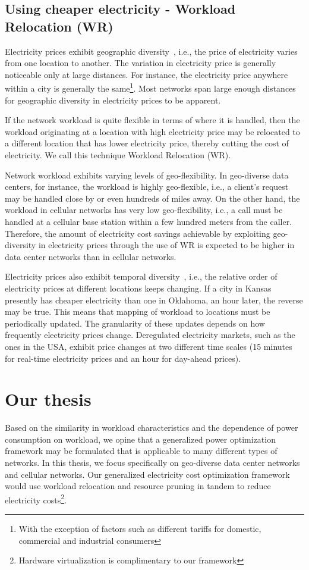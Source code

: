 \subsection{Using cheaper electricity - Workload Relocation (WR)}
Electricity prices exhibit geographic diversity~\cite{qureshiHotnets}, i.e., the price of electricity varies from one location to another. The variation in electricity price is generally noticeable only at large distances. For instance, the electricity price anywhere within a city is generally the same\footnote{With the exception of factors such as different tariffs for domestic, commercial and industrial consumers}. Most networks span large enough distances for geographic diversity in electricity prices to be apparent. 

If the network workload is quite flexible in terms of where it is handled, then the workload originating at a location with high electricity price may be relocated to a different location that has lower electricity price, thereby cutting the cost of electricity. We call this technique Workload Relocation (WR). 

Network workload exhibits varying levels of geo-flexibility. In geo-diverse data centers, for instance, the workload is highly geo-flexible, i.e., a client's request may be handled close by or even hundreds of miles away. On the other hand, the workload in cellular networks has very low geo-flexibility, i.e., a call must be handled at a cellular base station within a few hundred meters from the caller. Therefore, the amount of electricity cost savings achievable by exploiting geo-diversity in electricity prices through the use of WR is expected to be higher in data center networks than in cellular networks.

Electricity prices also exhibit temporal diversity~\cite{qureshiHotnets}, i.e., the relative order of electricity prices at different locations keeps changing. If a city in Kansas presently has cheaper electricity than one in Oklahoma, an hour later, the reverse may be true. This means that mapping of workload to locations must be periodically updated. The granularity of these updates depends on how frequently electricity prices change. Deregulated electricity markets, such as the ones in the USA, exhibit price changes at two different time scales (15 minutes for real-time electricity prices and an hour for day-ahead prices). 


\section{Our thesis} Based on the similarity in workload characteristics and the dependence of power consumption on workload, we opine that a generalized power optimization framework may be formulated that is applicable to many different types of networks. In this thesis, we focus specifically on geo-diverse data center networks and cellular networks. Our generalized electricity cost optimization framework would use workload relocation and resource pruning in tandem to reduce electricity costs\footnote{Hardware virtualization is complimentary to our framework}. 

